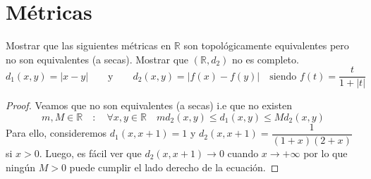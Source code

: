 \documentclass{article}
\theoremstyle{plain}
\theoremstyle{definition}
\newcommand{\R}{\mathbb{R}}
\newenvironment{ejercicio}[1]{\begin{trivlist}
\item[\hskip \labelsep {\bfseries Ejercicio}\hskip \labelsep {\bfseries #1.}]}{\end{trivlist}}
\begin{document}
\clearpage

\section*{Métricas}

\begin{ejercicio}{1}
    Mostrar que las siguientes métricas en \( \R \) son topológicamente equivalentes pero no son equivalentes (a secas). Mostrar que \( (\R, d_2) \) no es completo.
    \[
        d_1(x, y) = |x - y| \qquad \text{y} \qquad d_2(x, y) = |f(x) - f(y)| \quad \text{siendo } f(t) = \frac{t}{1 + |t|}
    \]
\end{ejercicio}
\begin{proof}
    Veamos que no son equivalentes (a secas) i.e que no existen \[ m, M \in \R \quad : \quad \forall x, y \in \R \quad m d_2(x, y) \leq d_1(x, y) \leq M d_2(x, y) \] Para ello, consideremos
    \( d_1(x, x+1) = 1 \) y \( d_2(x, x+1) = \dfrac{1}{(1+x)(2+x)} \) si \( x > 0 \). Luego, es fácil ver que \( d_2(x, x+1) \to 0 \) cuando \( x \to +\infty \) por lo que ningún \( M > 0 \) puede cumplir el lado derecho de la ecuación.


\end{proof}
\end{document}

